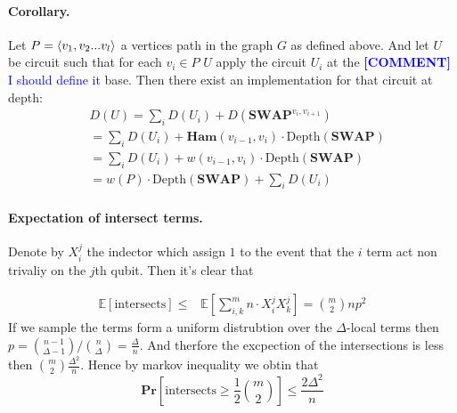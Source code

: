 \documentclass{article}
\newcommand{\commentt}[1]{\textcolor{blue}{ \textbf{[COMMENT]} #1}}
\newcommand{\ctt}[1]{\commentt{#1}}
\newcommand{\prb}[1]{ \mathbf{Pr} \left[ {#1} \right]}
\begin{document}
      \paragraph{Corollary.} Let \(P = \braket{v_{1}, v_{2} ... v_{l}}\) a vertices path in the graph \(G\) as defined above. And let \(U\) be circuit such that for each \(v_{i} \in P \) \(U\) apply the circuit \(U_{i}\) at the \ctt{I should define it} base. Then there exist an implementation for that circuit at depth:
      \begin{equation*}
	\begin{split}
	  & D(U) = \sum_{i}{D\left(U_{i}\right)+D\left(\textbf{SWAP}^{v_{i},v_{i+1}}\right)}\\
	  & = \sum_{i}{D\left(U_{i}\right) + \textbf{Ham}(v_{i-1},v_{i}) \cdot\text{Depth}\left(\textbf{SWAP}\right)} \\ 
	  & = \sum_{i}{D\left(U_{i}\right) + w(v_{i-1},v_{i}) \cdot\text{Depth}\left(\textbf{SWAP}\right)} \\
	  & = w\left(P\right)\cdot\text{Depth}\left(\textbf{SWAP}\right) +   \sum_{i}{D\left(U_{i}\right) }  
	\end{split}
      \end{equation*}



      \paragraph{Expectation of intersect terms.} Denote by $X_{i}^{j}$ the indector which assign $1$ to the event that the $i$ term act non trivaliy on the $j$th qubit. Then it's clear that

      \begin{equation*}
	\begin{split}
	  \mathbb{E}\left[ \text{intersects} \right] \le & \mathbb{E}\left[ \sum_{i,k}^{m}{n\cdot X_{i}^{j}X_{k}^{j}} \right]  = {m \choose 2}np^2 
	\end{split}
      \end{equation*}
      If we sample the terms form a uniform distrubtion over the $\Delta$-local terms then $p =  { n -1 \choose \Delta -1 }/ {n \choose \Delta}  = \frac{\Delta}{n}$. And therfore the excpection of the intersections is less then ${ m \choose 2}\frac{\Delta^2}{n}$. Hence by markov inequality we obtin that 
      \begin{equation*}
	\prb{ \text{intersects} \ge \frac{1}{2} { m \choose 2}  } \le \frac{2\Delta^2}{n} 
      \end{equation*}
\end{document}
